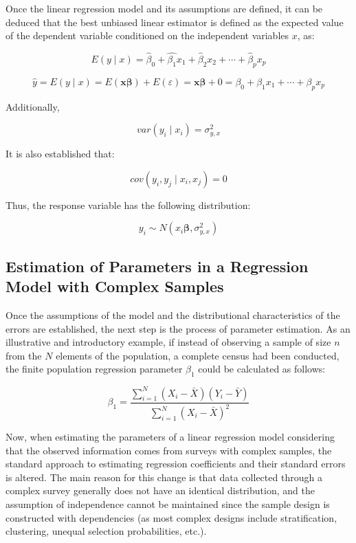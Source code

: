 \documentclass[
  12pt,
]{book}
\begin{document}
Once the linear regression model and its assumptions are defined, it can be deduced that the best unbiased linear estimator is defined as the expected value of the dependent variable conditioned on the independent variables \(x\), as:

\[
E\left(y\mid x\right)=\hat{\beta}_{0}+\hat{\beta_{1}}x_{1}+\hat{\beta}_{2}x_{2}+\cdots+\hat{\beta}_{p}x_{p}
\]

\[
\hat{y}  =  E\left(y\mid x\right)
 =  E\left(\boldsymbol{x}\boldsymbol{\beta}\right)+E\left(\varepsilon\right)
=  \boldsymbol{x}\boldsymbol{\beta}+0
  =  \beta_{0}+\beta_{1}x_{1}+\cdots+\beta_{p}x_{p}
\]

Additionally,

\[
var\left(y_{i}\mid x_{i}\right)  =  \sigma_{y,x}^{2}
\]

It is also established that:

\[
cov\left(y_{i},y_{j}\mid x_{i},x_{j}\right)  = 0
\]

Thus, the response variable has the following distribution:

\[
y_{i}  \sim  N\left(x_{i}\boldsymbol{\beta},\sigma_{y,x}^{2}\right)
\]

\subsection{Estimation of Parameters in a Regression Model with Complex Samples}\label{estimation-of-parameters-in-a-regression-model-with-complex-samples}

Once the assumptions of the model and the distributional characteristics of the errors are established, the next step is the process of parameter estimation. As an illustrative and introductory example, if instead of observing a sample of size \(n\) from the \(N\) elements of the population, a complete census had been conducted, the finite population regression parameter \(\beta_{1}\) could be calculated as follows:

\[
\beta_{1}  =  \frac{ \sum_{i=1}^{N}\left(X_{i}-\bar{X}\right)\left(Y_{i}-\bar{Y}\right)}{\sum_{i=1}^{N}\left(X_{i}-\bar{X}\right)^{2}}
\]

Now, when estimating the parameters of a linear regression model considering that the observed information comes from surveys with complex samples, the standard approach to estimating regression coefficients and their standard errors is altered. The main reason for this change is that data collected through a complex survey generally does not have an identical distribution, and the assumption of independence cannot be maintained since the sample design is constructed with dependencies (as most complex designs include stratification, clustering, unequal selection probabilities, etc.).
\end{document}
